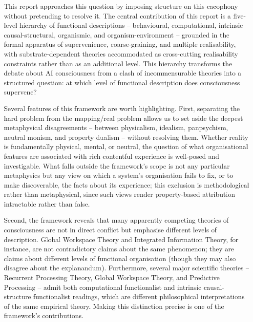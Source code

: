 \documentclass[11pt, a4paper, onecolumn, gdm]{google}
\begin{document}
This report approaches this question by imposing structure on this cacophony without pretending to resolve it.
The central contribution of this report is a five-level hierarchy of functional descriptions -- behavioural, computational, intrinsic causal-structural, organismic, and organism-environment -- grounded in the formal apparatus of supervenience, coarse-graining, and multiple realisability, with substrate-dependent theories accommodated as cross-cutting realisability constraints rather than as an additional level.
This hierarchy transforms the debate about AI consciousness from a clash of incommensurable theories into a structured question: at which level of functional description does consciousness supervene?

Several features of this framework are worth highlighting.
First, separating the hard problem from the mapping/real problem allows us to set aside the deepest metaphysical disagreements -- between physicalism, idealism, panpsychism, neutral monism, and property dualism -- without resolving them.
Whether reality is fundamentally physical, mental, or neutral, the question of what organisational features are associated with rich contentful experience is well-posed and investigable.
What falls outside the framework's scope is not any particular metaphysics but any view on which a system's organisation fails to fix, or to make discoverable, the facts about its experience; this exclusion is methodological rather than metaphysical, since such views render property-based attribution intractable rather than false.

Second, the framework reveals that many apparently competing theories of consciousness are not in direct conflict but emphasise different levels of description.
Global Workspace Theory and Integrated Information Theory, for instance, are not contradictory claims about the same phenomenon; they are claims about different levels of functional organisation (though they may also disagree about the explanandum).
Furthermore, several major scientific theories -- Recurrent Processing Theory, Global Workspace Theory, and Predictive Processing -- admit both computational functionalist and intrinsic causal-structure functionalist readings, which are different philosophical interpretations of the same empirical theory.
Making this distinction precise is one of the framework's contributions.
\end{document}
